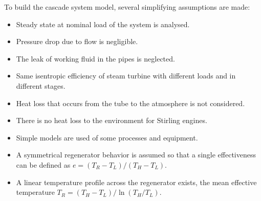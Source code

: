 

To build the cascade system model, several simplifying assumptions are made:

\begin{itemize}
	\item Steady state at nominal load of the system is analysed.
	\item Pressure drop due to flow is negligible.
	\item The leak of working fluid in the pipes is neglected.
	\item Same isentropic efficiency of steam turbine with different loads and in different stages.
	\item Heat loss that occurs from the tube to the atmosphere is not considered.
	\item There is no heat loss to the environment for Stirling engines.
	\item Simple models are used of some processes and equipment.
	\item A symmetrical regenerator behavior is assumed so that a single effectiveness can be defined as $e = (T_R - T_L) /(T_H - T_L)$.~\cite{Formosa2010, Juhasz2010}
	\item A linear temperature profile across the regenerator exists, the mean effective temperature $T_{R} = (T_H-T_L) / \ln(T_H/T_L)$.~\cite{Der2007, Cavazzuti2012}
\end{itemize}

